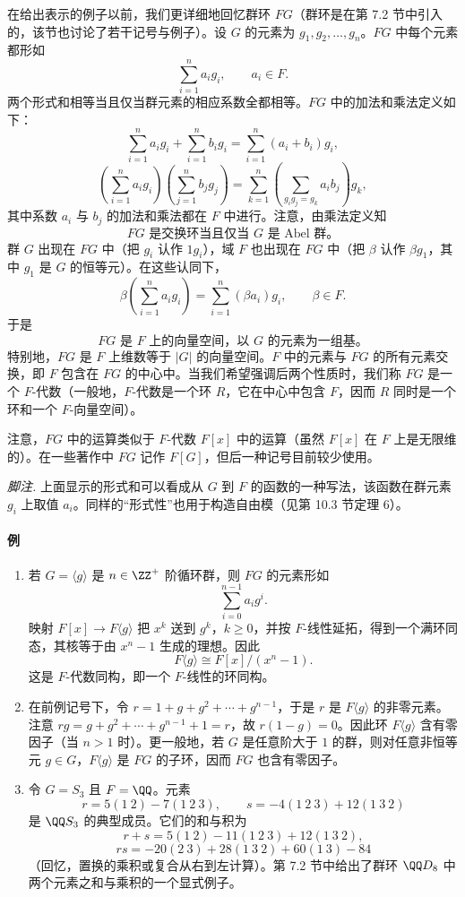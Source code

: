 在给出表示的例子以前，我们更详细地回忆群环 $FG$（群环是在第 7.2 节中引入的，该节也讨论了若干记号与例子）。设 $G$ 的元素为 $g_1,g_2,\ldots,g_n$。$FG$ 中每个元素都形如
\[
  \sum_{i=1}^n a_i g_i,
  \qquad a_i\in F.
\]
两个形式和相等当且仅当群元素的相应系数全都相等。$FG$ 中的加法和乘法定义如下：
\[
  \sum_{i=1}^n a_i g_i+\sum_{i=1}^n b_i g_i
  =\sum_{i=1}^n (a_i+b_i)g_i,
\]
\[
  \left(\sum_{i=1}^n a_i g_i\right)\left(\sum_{j=1}^n b_j g_j\right)
  =\sum_{k=1}^n\left(\sum_{g_i g_j=g_k}a_i b_j\right)g_k,
\]
其中系数 $a_i$ 与 $b_j$ 的加法和乘法都在 $F$ 中进行。注意，由乘法定义知
\[
  FG\text{ 是交换环当且仅当 }G\text{ 是 Abel 群。}
\]
群 $G$ 出现在 $FG$ 中（把 $g_i$ 认作 $1g_i$），域 $F$ 也出现在 $FG$ 中（把 $\beta$ 认作 $\beta g_1$，其中 $g_1$ 是 $G$ 的恒等元）。在这些认同下，
\[
  \beta\left(\sum_{i=1}^n a_i g_i\right)=\sum_{i=1}^n (\beta a_i)g_i,
  \qquad \beta\in F.
\]
于是
\[
  FG\text{ 是 }F\text{ 上的向量空间，以 }G\text{ 的元素为一组基。}
\]
特别地，$FG$ 是 $F$ 上维数等于 $|G|$ 的向量空间。$F$ 中的元素与 $FG$ 的所有元素交换，即 $F$ 包含在 $FG$ 的中心中。当我们希望强调后两个性质时，我们称 $FG$ 是一个 $F$-代数（一般地，$F$-代数是一个环 $R$，它在中心中包含 $F$，因而 $R$ 同时是一个环和一个 $F$-向量空间）。

注意，$FG$ 中的运算类似于 $F$-代数 $F[x]$ 中的运算（虽然 $F[x]$ 在 $F$ 上是无限维的）。在一些著作中 $FG$ 记作 $F[G]$，但后一种记号目前较少使用。

\noindent\emph{脚注.} 上面显示的形式和可以看成从 $G$ 到 $F$ 的函数的一种写法，该函数在群元素 $g_i$ 上取值 $a_i$。同样的“形式性”也用于构造自由模（见第 10.3 节定理 6）。

\paragraph{例}
\begin{enumerate}[label=(\arabic*)]
  \item 若 $G=\langle g\rangle$ 是 $n\in\ZZ^+$ 阶循环群，则 $FG$ 的元素形如
  \[
    \sum_{i=0}^{n-1} a_i g^i.
  \]
  映射 $F[x]\to F\langle g\rangle$ 把 $x^k$ 送到 $g^k$，$k\geq0$，并按 $F$-线性延拓，得到一个满环同态，其核等于由 $x^n-1$ 生成的理想。因此
  \[
    F\langle g\rangle\cong F[x]/(x^n-1).
  \]
  这是 $F$-代数同构，即一个 $F$-线性的环同构。

  \item 在前例记号下，令 $r=1+g+g^2+\cdots+g^{n-1}$，于是 $r$ 是 $F\langle g\rangle$ 的非零元素。注意 $rg=g+g^2+\cdots+g^{n-1}+1=r$，故 $r(1-g)=0$。因此环 $F\langle g\rangle$ 含有零因子（当 $n>1$ 时）。更一般地，若 $G$ 是任意阶大于 $1$ 的群，则对任意非恒等元 $g\in G$，$F\langle g\rangle$ 是 $FG$ 的子环，因而 $FG$ 也含有零因子。

  \item 令 $G=S_3$ 且 $F=\QQ$。元素
  \[
    r=5(1\ 2)-7(1\ 2\ 3),\qquad
    s=-4(1\ 2\ 3)+12(1\ 3\ 2)
  \]
  是 $\QQ S_3$ 的典型成员。它们的和与积为
  \[
    r+s=5(1\ 2)-11(1\ 2\ 3)+12(1\ 3\ 2),
  \]
  \[
    rs=-20(2\ 3)+28(1\ 3\ 2)+60(1\ 3)-84
  \]
  （回忆，置换的乘积或复合从右到左计算）。第 7.2 节中给出了群环 $\QQ D_8$ 中两个元素之和与乘积的一个显式例子。
\end{enumerate}

